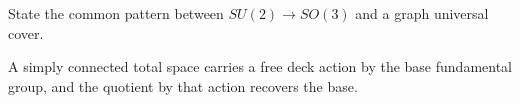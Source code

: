 \begin{problem}\label{prob:viii13-20}
State the common pattern between \(SU(2)\to SO(3)\) and a graph universal cover.
\end{problem}
\begin{solution}
A simply connected total space carries a free deck action by the base fundamental group, and the quotient by that action recovers the base.
\end{solution}
